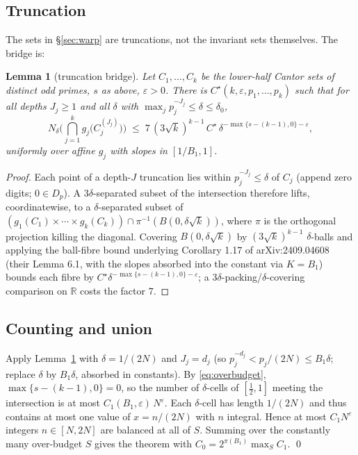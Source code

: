 \documentclass[11pt]{article}
\newtheorem{lemma}[theorem]{Lemma}
\begin{document}
\subsection{Truncation}
The sets in \S\ref{sec:warp} are truncations, not the invariant sets themselves.  The
bridge is:

\begin{lemma}[truncation bridge]\label{lem:T}
Let $C_1,\dots,C_k$ be the lower-half Cantor sets of distinct odd primes, $s$ as above,
$\varepsilon>0$.  There is $C^\star(k,\varepsilon,p_1,\dots,p_k)$ such that for all depths
$J_j\ge1$ and all $\delta$ with $\max_jp_j^{-J_j}\le\delta\le\delta_0$,
\[
N_\delta\Big(\bigcap_{j=1}^k g_j\big(C_j^{(J_j)}\big)\Big)\;\le\;
7\,(3\sqrt k)^{k-1}\,C^\star\,\delta^{-\max\{s-(k-1),0\}-\varepsilon},
\]
uniformly over affine $g_j$ with slopes in $[1/B_1,1]$.
\end{lemma}

\begin{proof}
Each point of a depth-$J$ truncation lies within $p_j^{-J_j}\le\delta$ of $C_j$ (append
zero digits; $0\in D_p$).  A $3\delta$-separated subset of the intersection therefore
lifts, coordinatewise, to a $\delta$-separated subset of
$(g_1(C_1)\times\cdots\times g_k(C_k))\cap\pi^{-1}(B(0,\delta\sqrt k))$, where $\pi$ is the
orthogonal projection killing the diagonal.  Covering $B(0,\delta\sqrt k)$ by
$(3\sqrt k)^{k-1}$ $\delta$-balls and applying the ball-fibre bound underlying Corollary
1.17 of arXiv:2409.04608 (their Lemma 6.1, with the slopes absorbed into the constant via
$K=B_1$) bounds each fibre by $C^\star\delta^{-\max\{s-(k-1),0\}-\varepsilon}$; a
$3\delta$-packing/$\delta$-covering comparison on $\mathbb R$ costs the factor $7$.
\end{proof}

\subsection{Counting and union}
Apply Lemma~\ref{lem:T} with $\delta=1/(2N)$ and $J_j=d_j$ (so
$p_j^{-d_j}<p_j/(2N)\le B_1\delta$; replace $\delta$ by $B_1\delta$, absorbed in
constants).  By \eqref{eq:overbudget}, $\max\{s-(k-1),0\}=0$, so the number of
$\delta$-cells of $[\tfrac12,1]$ meeting the intersection is at most
$C_1(B_1,\varepsilon)\,N^{\varepsilon}$.  Each $\delta$-cell has length $1/(2N)$ and thus
contains at most one value of $x=n/(2N)$ with $n$ integral.  Hence at most
$C_1N^{\varepsilon}$ integers $n\in[N,2N]$ are balanced at all of $S$.  Summing over the
constantly many over-budget $S$ gives the theorem with
$C_0=2^{\pi(B_1)}\max_SC_1$. \qed
\end{document}
